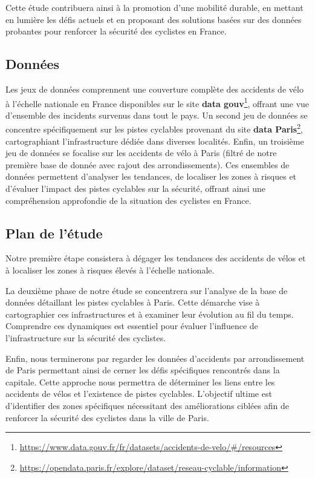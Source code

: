 \documentclass[french,]{compterendu}
\let\rmarkdownfootnote\footnote%
\def\footnote{\protect\rmarkdownfootnote}
\theoremstyle{urcastyle}
\theoremstyle{remark}
\begin{document}
Cette étude contribuera ainsi à la promotion d'une mobilité durable, en mettant en lumière les défis actuels et en proposant des solutions basées sur des données probantes pour renforcer la sécurité des cyclistes en France.

\hypertarget{donnuxe9es}{%
\subsection{Données}\label{donnuxe9es}}

Les jeux de données comprennent une couverture complète des accidents de vélo à l'échelle nationale en France disponibles sur le site \textbf{data gouv}\footnote{\url{https://www.data.gouv.fr/fr/datasets/accidents-de-velo/\#/resources}}, offrant une vue d'ensemble des incidents survenus dans tout le pays. Un second jeu de données se concentre spécifiquement sur les pistes cyclables provenant du site \textbf{data Paris}\footnote{\url{https://opendata.paris.fr/explore/dataset/reseau-cyclable/information}}, cartographiant l'infrastructure dédiée dans diverses localités. Enfin, un troisième jeu de données se focalise sur les accidents de vélo à Paris (filtré de notre première base de donnée avec rajout des arrondissements). Ces ensembles de données permettent d'analyser les tendances, de localiser les zones à risques et d'évaluer l'impact des pistes cyclables sur la sécurité, offrant ainsi une compréhension approfondie de la situation des cyclistes en France.

\hypertarget{plan-de-luxe9tude}{%
\subsection{Plan de l'étude}\label{plan-de-luxe9tude}}

Notre première étape consistera à dégager les tendances des accidents de vélos et à localiser les zones à risques élevés à l'échelle nationale.

La deuxième phase de notre étude se concentrera sur l'analyse de la base de données détaillant les pistes cyclables à Paris. Cette démarche vise à cartographier ces infrastructures et à examiner leur évolution au fil du temps. Comprendre ces dynamiques est essentiel pour évaluer l'influence de l'infrastructure sur la sécurité des cyclistes.

Enfin, nous terminerons par regarder les données d'accidents par arrondissement de Paris permettant ainsi de cerner les défis spécifiques rencontrés dans la capitale. Cette approche nous permettra de déterminer les liens entre les accidents de vélos et l'existence de pistes cyclables. L'objectif ultime est d'identifier des zones spécifiques nécessitant des améliorations ciblées afin de renforcer la sécurité des cyclistes dans la ville de Paris.
\end{document}
